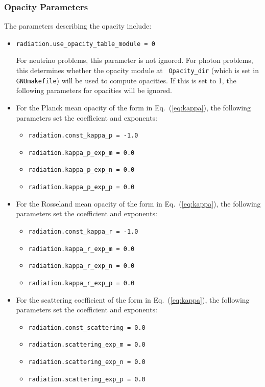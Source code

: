 \documentclass[11pt,letterpaper]{article}
\begin{document}
\subsubsection{Opacity Parameters}
\label{sec:opacpars}

The parameters describing the opacity include:
\begin{itemize}

\item {\tt radiation.use\_opacity\_table\_module = 0}
  
  For neutrino problems, this parameter is not ignored.  For photon
  problems, this determines whether the opacity module at {\tt
    Opacity\_dir} (which is set in {\tt GNUmakefile}) will be used to
  compute opacities.  If this is set to 1, the following parameters
  for opacities will be ignored.

\item For the Planck mean opacity of the form in Eq.~(\ref{eq:kappa}),
  the following parameters set the coefficient and exponents:
  \begin{itemize}
  \item {\tt radiation.const\_kappa\_p = -1.0}
  \item {\tt radiation.kappa\_p\_exp\_m = 0.0}
  \item {\tt radiation.kappa\_p\_exp\_n = 0.0}
  \item {\tt radiation.kappa\_p\_exp\_p = 0.0}
  \end{itemize}

\item For the Rosseland mean opacity of the form in Eq.~(\ref{eq:kappa}),
  the following parameters set the coefficient and exponents:
  \begin{itemize}
  \item {\tt radiation.const\_kappa\_r = -1.0}
  \item {\tt radiation.kappa\_r\_exp\_m = 0.0}
  \item {\tt radiation.kappa\_r\_exp\_n = 0.0}
  \item {\tt radiation.kappa\_r\_exp\_p = 0.0}
  \end{itemize}
  
\item For the scattering coefficient of the form in Eq.~(\ref{eq:kappa}),
  the following parameters set the coefficient and exponents:
  \begin{itemize}
  \item {\tt radiation.const\_scattering = 0.0}
  \item {\tt radiation.scattering\_exp\_m = 0.0}
  \item {\tt radiation.scattering\_exp\_n = 0.0}
  \item {\tt radiation.scattering\_exp\_p = 0.0}
  \end{itemize}


\end{itemize}
\end{document}
